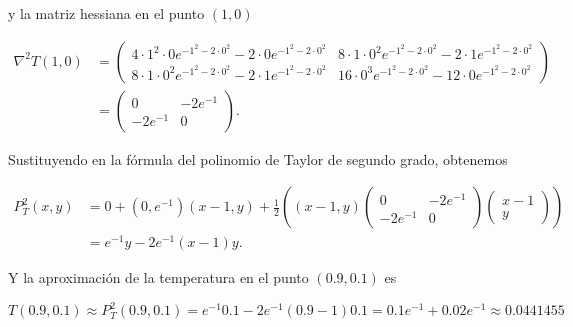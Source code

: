 \documentclass[
  a4paper,
]{scrreport}
\theoremstyle{definition}
\theoremstyle{remark}
\begin{document}
\begin{tcolorbox}
\begin{enumerate}
  y la matriz hessiana en el punto \((1,0)\)

  \begin{align*}
  \nabla^2T(1,0) &= 
  \begin{pmatrix}
  4\cdot 1^2\cdot 0e^{-1^2 - 2\cdot 0^2} - 2\cdot 0e^{-1^2 - 2\cdot 0^2} & 8\cdot 1\cdot 0^2e^{-1^2 - 2\cdot 0^2} - 2\cdot 1e^{-1^2 - 2\cdot 0^2} \\
  8\cdot 1\cdot 0^2e^{-1^2 - 2\cdot 0^2} - 2\cdot 1e^{-1^2 - 2\cdot 0^2} & 16\cdot 0^3e^{-1^2 - 2\cdot 0^2} - 12\cdot 0e^{-1^2 - 2\cdot 0^2}
  \end{pmatrix} \\
  &= \begin{pmatrix}
  0 & -2e^{-1} \\
  -2e^{-1} & 0
  \end{pmatrix}.
  \end{align*}

  Sustituyendo en la fórmula del polinomio de Taylor de segundo grado,
  obtenemos

  \begin{align*}
  P_T^2(x,y) &= 0 + (0,e^{-1})(x-1, y) + \frac{1}{2} \left((x-1,y)\begin{pmatrix}0 & -2e^{-1} \\ -2e^{-1} & 0\end{pmatrix}\begin{pmatrix}x-1 \\ y\end{pmatrix}\right) \\
  &= e^{-1}y - 2e^{-1}(x-1)y.
  \end{align*}

  Y la aproximación de la temperatura en el punto \((0.9,0.1)\) es

  \[
  T(0.9,0.1) 
  \approx P_T^2(0.9,0.1) 
  = e^{-1}0.1 - 2e^{-1}(0.9-1)0.1 
  = 0.1e^{-1} + 0.02e^{-1} 
  \approx 0.0441455
  \]
\end{enumerate}

\end{tcolorbox}
\end{document}
